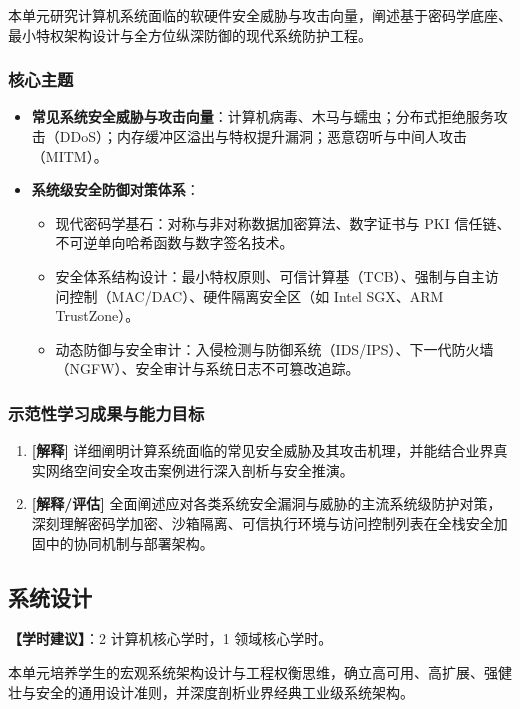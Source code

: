 本单元研究计算机系统面临的软硬件安全威胁与攻击向量，阐述基于密码学底座、最小特权架构设计与全方位纵深防御的现代系统防护工程。

\subsubsection{核心主题}
\begin{itemize}
    \item \textbf{常见系统安全威胁与攻击向量}：计算机病毒、木马与蠕虫；分布式拒绝服务攻击（DDoS）；内存缓冲区溢出与特权提升漏洞；恶意窃听与中间人攻击（MITM）。
    \item \textbf{系统级安全防御对策体系}：
    \begin{itemize}
        \item 现代密码学基石：对称与非对称数据加密算法、数字证书与 PKI 信任链、不可逆单向哈希函数与数字签名技术。
        \item 安全体系结构设计：最小特权原则、可信计算基（TCB）、强制与自主访问控制（MAC/DAC）、硬件隔离安全区（如 Intel SGX、ARM TrustZone）。
        \item 动态防御与安全审计：入侵检测与防御系统（IDS/IPS）、下一代防火墙（NGFW）、安全审计与系统日志不可篡改追踪。
    \end{itemize}
\end{itemize}

\subsubsection{示范性学习成果与能力目标}
\begin{enumerate}
    \item \textbf{[解释]} 详细阐明计算系统面临的常见安全威胁及其攻击机理，并能结合业界真实网络空间安全攻击案例进行深入剖析与安全推演。
    \item \textbf{[解释/评估]} 全面阐述应对各类系统安全漏洞与威胁的主流系统级防护对策，深刻理解密码学加密、沙箱隔离、可信执行环境与访问控制列表在全栈安全加固中的协同机制与部署架构。
\end{enumerate}

\subsection{系统设计}
\textbf{【学时建议】}：2 计算机核心学时，1 领域核心学时。

本单元培养学生的宏观系统架构设计与工程权衡思维，确立高可用、高扩展、强健壮与安全的通用设计准则，并深度剖析业界经典工业级系统架构。

